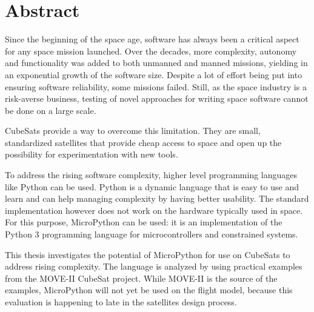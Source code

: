 \cleardoublepage
\section*{Abstract}

Since the beginning of the space age, software has always been a critical aspect for any space mission launched. Over the decades, more complexity, autonomy and functionality was added to both unmanned and manned missions, yielding in an exponential growth of the software size. Despite a lot of effort being put into ensuring software reliability, some missions failed. Still, as the space industry is a risk-averse business, testing of novel approaches for writing space software cannot be done on a large scale.

CubeSats provide a way to overcome this limitation. They are small, standardized satellites that provide cheap access to space and open up the possibility for experimentation with new tools.

To address the rising software complexity, higher level programming languages like Python can be used. Python is a dynamic language that is easy to use and learn and can help managing complexity by having better usability. The standard implementation however does not work on the hardware typically used in space. For this purpose, MicroPython can be used: it is an implementation of the Python 3 programming language for microcontrollers and constrained systems.

This thesis investigates the potential of MicroPython for use on CubeSats to address rising complexity. The language is analyzed by using practical examples from the MOVE-II CubeSat project. While MOVE-II is the source of the examples, MicroPython will not yet be used on the flight model, because this evaluation is happening to late in the satellites design process.

